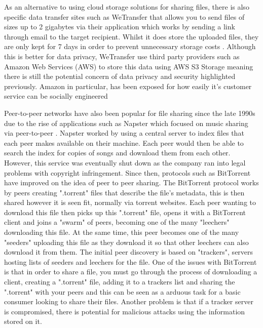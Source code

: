 \documentclass[]{report}
\begin{document}
	As an alternative to using cloud storage solutions for sharing files, there is also specific data transfer sites such as WeTransfer that allows you to send files of sizes up to 2 gigabytes via their application which works by sending a link through email to the target recipient. Whilst it does store the uploaded files, they are only kept for 7 days in order to prevent unnecessary storage costs \cite{WeTransfer Storage Time}. Although this is better for data privacy, WeTransfer use third party providers such as Amazon Web Services (AWS) to store this data using AWS S3 Storage \cite{WeTransfer AWS Case Study} meaning there is still the potential concern of data privacy and security highlighted previously. Amazon in particular, has been exposed for how easily it's customer service can be socially engineered \cite{Amazon Social Engineering}
	
	Peer-to-peer networks have also been popular for file sharing since the late 1990s due to the rise of applications such as Napster which focused on music sharing via peer-to-peer . Napster worked by using a central server to index files that each peer makes available on their machine. Each peer would then be able to search the index for copies of songs and download them from each other. However, this service was eventually shut down as the company ran into legal problems with copyright infringement. Since then, protocols such as BitTorrent have improved on the idea of peer to peer sharing. The BitTorrent protocol works by peers creating ".torrent" files that describe the file's metadata, this is then shared however it is seen fit, normally via torrent websites. Each peer wanting to download this file then picks up this ".torrent" file, opens it with a BitTorrent client and joins a "swarm" of peers, becoming one of the many "leechers" downloading this file. At the same time, this peer becomes one of the many "seeders" uploading this file as they download it so that other leechers can also download it from them. The initial peer discovery is based on "trackers", servers hosting lists of seeders and leechers for the file. One of the issues with BitTorrent is that in order to share a file, you must go through the process of downloading a client, creating a ".torrent" file, adding it to a trackers list and sharing the ".torrent" with your peers and this can be seen as a arduous task for a basic consumer looking to share their files. Another problem is that if a tracker server is compromised, there is potential for malicious attacks using the information stored on it.
	
\end{document}
